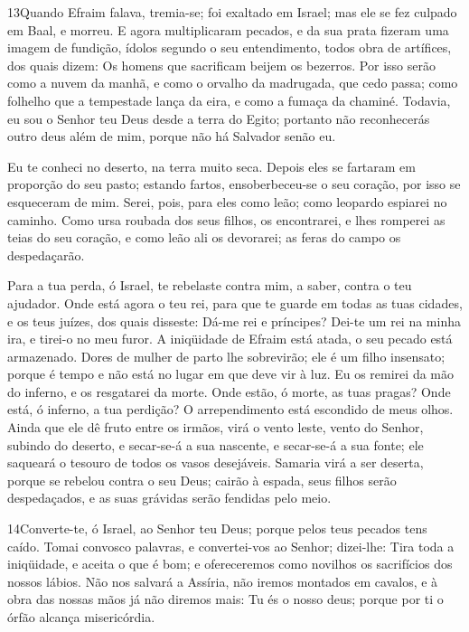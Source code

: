 \medskip

\lettrine{13} Quando Efraim falava, tremia-se; foi exaltado em
Israel; mas ele se fez culpado em Baal, e morreu. E agora
multiplicaram pecados, e da sua prata fizeram uma imagem de
fundição, ídolos segundo o seu entendimento, todos obra de
artífices, dos quais dizem: Os homens que sacrificam beijem os
bezerros. Por isso serão como a nuvem da manhã, e como o orvalho
da madrugada, que cedo passa; como folhelho que a tempestade lança
da eira, e como a fumaça da chaminé. Todavia, eu sou o Senhor
teu Deus desde a terra do Egito; portanto não reconhecerás outro
deus além de mim, porque não há Salvador senão eu.

Eu te conheci no deserto, na terra muito seca. Depois eles se
fartaram em proporção do seu pasto; estando fartos, ensoberbeceu-se
o seu coração, por isso se esqueceram de mim. Serei, pois, para
eles como leão; como leopardo espiarei no caminho. Como ursa
roubada dos seus filhos, os encontrarei, e lhes romperei as teias do
seu coração, e como leão ali os devorarei; as feras do campo os
despedaçarão.

Para a tua perda, ó Israel, te rebelaste contra mim, a saber,
contra o teu ajudador. Onde está agora o teu rei, para que te
guarde em todas as tuas cidades, e os teus juízes, dos quais
disseste: Dá-me rei e príncipes? Dei-te um rei na minha ira,
e tirei-o no meu furor. A iniqüidade de Efraim está atada, o
seu pecado está armazenado. Dores de mulher de parto lhe
sobrevirão; ele é um filho insensato; porque é tempo e não está no
lugar em que deve vir à luz. Eu os remirei da mão do inferno,
e os resgatarei da morte. Onde estão, ó morte, as tuas pragas? Onde
está, ó inferno, a tua perdição? O arrependimento está escondido de
meus olhos. Ainda que ele dê fruto entre os irmãos, virá o
vento leste, vento do Senhor, subindo do deserto, e secar-se-á a sua
nascente, e secar-se-á a sua fonte; ele saqueará o tesouro de todos
os vasos desejáveis. Samaria virá a ser deserta, porque se
rebelou contra o seu Deus; cairão à espada, seus filhos serão
despedaçados, e as suas grávidas serão fendidas pelo meio.

\medskip

\lettrine{14} Converte-te, ó Israel, ao Senhor teu Deus;
porque pelos teus pecados tens caído. Tomai convosco palavras, e
convertei-vos ao Senhor; dizei-lhe: Tira toda a iniqüidade, e aceita
o que é bom; e ofereceremos como novilhos os sacrifícios dos nossos
lábios. Não nos salvará a Assíria, não iremos montados em
cavalos, e à obra das nossas mãos já não diremos mais: Tu és o nosso
deus; porque por ti o órfão alcança misericórdia.

